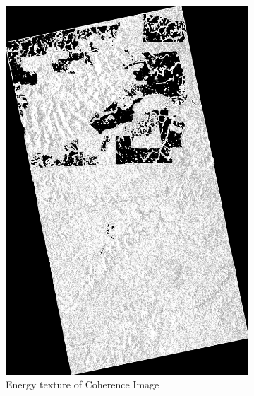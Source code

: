 \begin{figure}[H]\ContinuedFloat
  \begin{subfigure}[b]{0.4\linewidth}
    \includegraphics[width=\linewidth]{Chapter4/glcm_textures/energyimage.png}
    \caption{Energy texture of Coherence Image}
  \end{subfigure}
  \begin{subfigure}[b]{0.4\linewidth}

\end{subfigure}
\end{figure}
